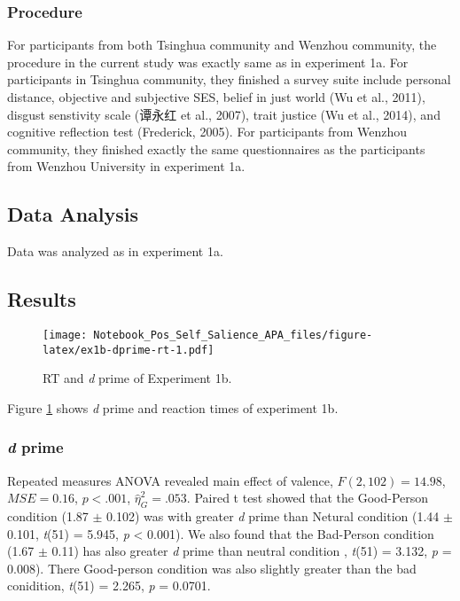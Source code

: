 \documentclass[man]{apa6}
\begin{document}
\hypertarget{procedure-1}{%
\subsubsection{Procedure}\label{procedure-1}}

For participants from both Tsinghua community and Wenzhou community, the procedure in the current study was exactly same as in experiment 1a. For participants in Tsinghua community, they finished a survey suite include personal distance, objective and subjective SES, belief in just world (Wu et al., 2011), disgust senstivity scale (谭永红 et al., 2007), trait justice (Wu et al., 2014), and cognitive reflection test (Frederick, 2005). For participants from Wenzhou community, they finished exactly the same questionnaires as the participants from Wenzhou University in experiment 1a.

\hypertarget{data-analysis-2}{%
\subsection{Data Analysis}\label{data-analysis-2}}

Data was analyzed as in experiment 1a.

\hypertarget{results-1}{%
\subsection{Results}\label{results-1}}

\begin{figure}
\centering
\texttt{[image: Notebook\_Pos\_Self\_Salience\_APA\_files/figure-latex/ex1b-dprime-rt-1.pdf]}
\caption{\label{fig:ex1b-dprime-rt}RT and \emph{d} prime of Experiment 1b.}
\end{figure}

Figure \ref{fig:ex1b-dprime-rt} shows \emph{d} prime and reaction times of experiment 1b.

\hypertarget{d-prime-1}{%
\subsubsection{\texorpdfstring{\emph{d} prime}{d prime}}\label{d-prime-1}}

Repeated measures ANOVA revealed main effect of valence, \(F(2, 102) = 14.98\), \(\mathit{MSE} = 0.16\), \(p < .001\), \(\hat{\eta}^2_G = .053\). Paired t test showed that the Good-Person condition (1.87 \(\pm\) 0.102) was with greater \emph{d} prime than Netural condition (1.44 \(\pm\) 0.101, \emph{t}(51) = 5.945, \emph{p} \textless{} 0.001). We also found that the Bad-Person condition (1.67 \(\pm\) 0.11) has also greater \emph{d} prime than neutral condition , \emph{t}(51) = 3.132, \emph{p} = 0.008). There Good-person condition was also slightly greater than the bad conidition, \emph{t}(51) = 2.265, \emph{p} = 0.0701.
\end{document}
